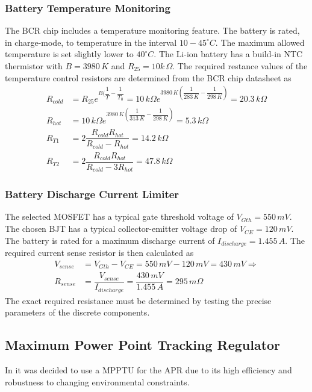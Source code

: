 \subsubsection{Battery Temperature Monitoring}
%
The \ac{BCR} chip includes a temperature monitoring feature. The battery is rated, in charge-mode, to temperature in the interval $10-45^{\circ}C$. The maximum allowed temperature is set slightly lower to $40^{\circ}C$. The Li-ion battery has a build-in \ac{NTC} thermistor with $B=3980\,K$ and $R_{25}=10k\,\Omega$. The required restance values of the temperature control resistors are determined from the \ac{BCR} chip datasheet as 
%
\begin{equation}
\begin{split}
R_{cold}&=R_{25}e^{B(\dfrac{1}{T}-\dfrac{1}{T_0}}=10\,k\Omega e^{3980\,K(\dfrac{1}{283	\,K}-\dfrac{1}{298\,K})}=20.3\,k\Omega\\
R_{hot}&=10\,k\Omega e^{3980\,K(\dfrac{1}{313	\,K}-\dfrac{1}{298\,K})}=5.3\,k\Omega\\
R_{T1}&=2\dfrac{R_{cold}R_{hot}}{R_{cold}-R_{hot}}=14.2\,k\Omega\\
R_{T2}&=2\dfrac{R_{cold}R_{hot}}{R_{cold}-3R_{hot}}=47.8\,k\Omega
\end{split}
\end{equation}

%
\subsubsection{Battery Discharge Current Limiter}
%
The selected MOSFET has a typical gate threshold voltage of $V_{Gth}=550\,mV$. The chosen \ac{BJT} has a typical collector-emitter voltage drop of $V_{CE}=120\,mV$. The battery is rated for a maximum discharge current of $I_{discharge}=1.455\,A$. The required current sense resistor is then calculated as 
%
\begin{equation}
\begin{split}
V_{sense}&=V_{Gth}-V_{CE}=550\,mV-120\,mV=430\,mV \Rightarrow\\
R_{sense}&=\dfrac{V_{sense}}{I_{discharge}}=\dfrac{430\,mV}{1.455\,A}=295\,m\Omega
\end{split}
\end{equation}
%
The exact required resistance must be determined by testing the precise parameters of the discrete components.
%
%
%
\subsection{Maximum Power Point Tracking Regulator}
%
In \cite{PDR} it was decided to use a \ac{MPPTU} for the \ac{APR} due to its high efficiency and robustness to changing environmental constraints.

